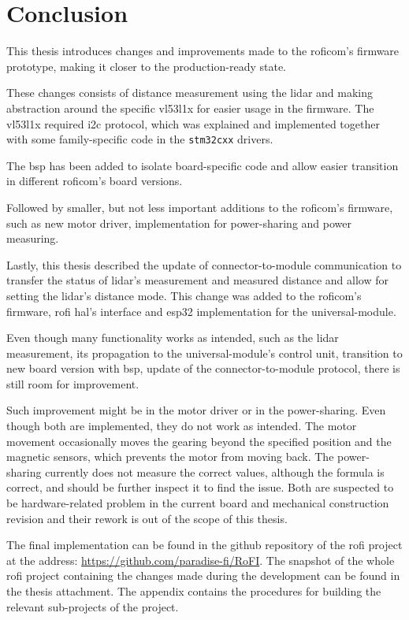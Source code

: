 \documentclass[
  digital,     %
  oneside,     %
  nosansbold,  %
  nocolorbold, %
  nolof,         %
  nolot,         %
]{fithesis4}
\begin{document}
\chapter{Conclusion}

This thesis introduces changes and improvements made to the \acrshort{roficom}'s firmware prototype,
making it closer to the production-ready state.

These changes consists of distance measurement using the \acrshort{lidar} and making abstraction
around the specific \gls{vl53l1x} for easier usage in the firmware. The \gls{vl53l1x} required
\acrshort{i2c} protocol, which was explained and implemented together with some family-specific code
in the \verb|stm32cxx| drivers.

The \acrlong{bsp} has been added to isolate board-specific code and allow easier transition in
different \acrshort{roficom}'s board versions.

Followed by smaller, but not less important additions to the \acrshort{roficom}'s firmware, such as
new motor driver, implementation for power-sharing and power measuring.

Lastly, this thesis described the update of connector-to-module communication to transfer the status
of \acrshort{lidar}'s measurement and measured distance and allow for setting the \acrshort{lidar}'s
distance mode. This change was added to the \acrshort{roficom}'s firmware, \acrshort{rofi}
\acrshort{hal}'s interface and esp32 implementation for the \gls{universal-module}.

Even though many functionality works as intended, such as the \acrshort{lidar} measurement, its
propagation to the \gls{universal-module}'s control unit, transition to new board version with
\acrlong{bsp}, update of the connector-to-module protocol, there is still room for improvement.

Such improvement might be in the motor driver or in the power-sharing. Even though both are
implemented, they do not work as intended. The motor movement occasionally moves the gearing beyond
the specified position and the magnetic sensors, which prevents the motor from moving back. The
power-sharing currently does not measure the correct values, although the formula is correct, and
should be further inspect it to find the issue. Both are suspected to be hardware-related problem in
the current board and mechanical construction revision and their rework is out of the scope of this
thesis.

The final implementation can be found in the github repository of the \acrshort{rofi} project at the
address: \url{https://github.com/paradise-fi/RoFI}. The snapshot of the whole \acrshort{rofi}
project containing the changes made during the development can be found in the thesis attachment.
The appendix contains the procedures for building the relevant sub-projects of the project.
\end{document}
